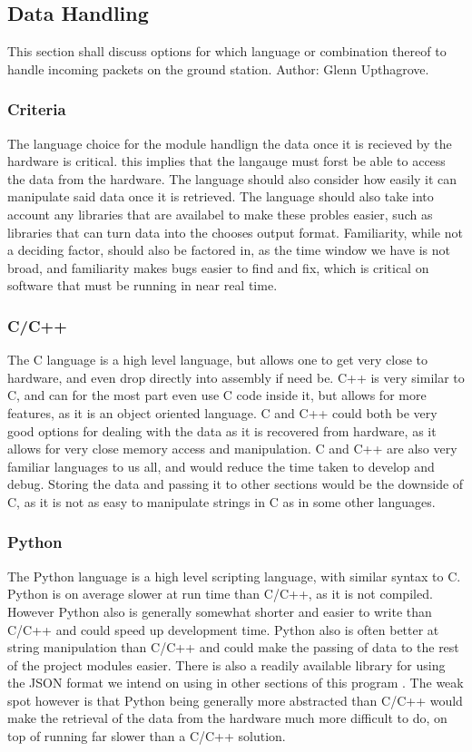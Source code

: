 \documentclass[onecolumn, draftclsnofoot,10pt, compsoc]{IEEEtran}
\begin{document}
\subsection{Data Handling}
This section shall discuss options for which language or combination thereof to handle incoming packets on the ground station. Author: Glenn Upthagrove.
\subsubsection{Criteria}
The language choice for the module handlign the data once it is recieved by the hardware is critical. this implies that the langauge must forst be able to access the data from the hardware. The language should also consider how easily it can manipulate said data once it is retrieved. The language should also take into account any libraries that are availabel to make these probles easier, such as libraries that can turn data into the chooses output format. Familiarity, while not a deciding factor, should also be factored in, as the time window we have is not broad, and familiarity makes bugs easier to find and fix, which is critical on software that must be running in near real time. 
\subsubsection{C/C++}
The C language is a high level language, but allows one to get very close to hardware, and even drop directly into assembly if need be. C++ is very similar to C, and can for the most part even use C code inside it, but allows for more features, as it is an object oriented language. C and C++ could both be very good options for dealing with the data as it is recovered from hardware, as it allows for very close memory access and manipulation. C and C++ are also very familiar languages to us all, and would reduce the time taken to develop and debug. Storing the data and passing it to other sections would be the downside of C, as it is not as easy to manipulate strings in C as in some other languages.
\subsubsection{Python}
The Python language is a high level scripting language, with similar syntax to C. Python is on average slower at run time than C/C++, as it is not compiled. However Python also is generally somewhat shorter and easier to write than C/C++ and could speed up development time. Python also is often better at string manipulation than C/C++ and could make the passing of data to the rest of the project modules easier. There is also a readily available library for using the JSON format we intend on using in other sections of this program \cite{refpython}. The weak spot however is that Python being generally more abstracted than C/C++ would make the retrieval of the data from the hardware much more difficult to do, on top of running far slower than a C/C++ solution.
\end{document}

